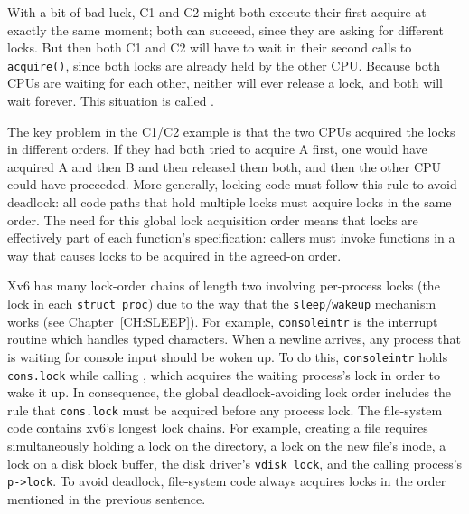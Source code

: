 \begin{center}
  
\end{center}

With a bit of bad luck, C1 and C2 might both execute their first
acquire at exactly the same moment; both can succeed, since they are
asking for different locks. But then both C1 and C2 will have to wait
in their second calls to {\tt acquire()}, since both locks are already
held by the other CPU. Because both CPUs are waiting for each
other, neither will ever release a lock, and both will wait forever.
This situation is called .

The key problem in the C1/C2 example is that the two CPUs acquired
the locks in different orders. If they had both tried to acquire A
first, one would have acquired A and then B and then released them both,
and then the other CPU could have proceeded. More generally,
locking code must follow this rule to avoid deadlock: all code paths
that hold multiple locks must acquire locks in the same order. The
need for this global lock acquisition order means that locks are
effectively part of each function's specification: callers must invoke
functions in a way that causes locks to be acquired in the agreed-on
order.

Xv6 has many lock-order chains of length two involving
per-process locks
(the lock in each
\lstinline{struct proc})
due to the way that the
\lstinline{sleep}/\lstinline{wakeup}
mechanism
works (see Chapter~\ref{CH:SLEEP}).
For example,
\lstinline{consoleintr}
is the interrupt routine which handles typed characters.
When a newline arrives, any process that is waiting for
console input should be woken up.
To do this,
\lstinline{consoleintr}
holds
\lstinline{cons.lock}
while calling 
,
which acquires 
the waiting process's lock in order to wake it up.
In consequence, the global deadlock-avoiding
lock order includes the rule that
\lstinline{cons.lock}
must be acquired before any process lock.
The file-system code contains xv6's longest lock chains.
For example, creating a file requires simultaneously
holding a lock on the directory, a lock on the new file's inode,
a lock on a disk block buffer, 
the disk driver's \lstinline{vdisk_lock},
and
the calling process's \lstinline{p->lock}.
To avoid deadlock, file-system code always acquires locks in the order
mentioned in the previous sentence.

